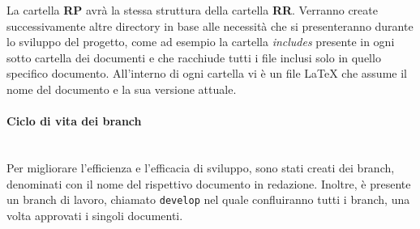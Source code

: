La cartella \textbf{RP} avrà la stessa struttura della cartella \textbf{RR}. Verranno create successivamente altre directory in base alle necessità che si presenteranno durante lo sviluppo del progetto, come ad esempio la cartella \emph{includes} presente in ogni sotto cartella dei documenti e che racchiude tutti i file inclusi solo in quello specifico documento. All’interno di ogni cartella vi è un file LaTeX che assume il nome del documento e la sua versione attuale.
\paragraph{Ciclo di vita dei branch}\mbox{}\\[0.4cm]
Per migliorare l'efficienza e l'efficacia di sviluppo, sono stati creati dei branch, denominati con il nome del rispettivo documento in redazione.
Inoltre, è presente un branch di lavoro, chiamato \texttt{develop} nel quale confluiranno tutti i branch, una volta approvati i singoli documenti.
